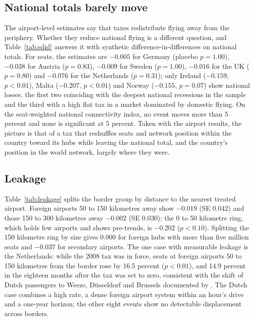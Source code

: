 \subsection{National totals barely move}

The airport-level estimates say that taxes redistribute flying away from the periphery. Whether they
reduce national flying is a different question, and Table~\ref{tab:sdid} answers it with synthetic
difference-in-differences on national totals. For seats, the estimates are $-0.005$ for Germany (placebo
$p=1.00$), $-0.038$ for Austria ($p=0.83$), $-0.009$ for Sweden ($p=1.00$), $-0.016$ for the UK
($p=0.80$) and $-0.076$ for the Netherlands ($p=0.31$); only Ireland ($-0.159$, $p<0.01$), Malta
($-0.207$, $p<0.01$) and Norway ($-0.155$, $p=0.07$) show national losses, the first two coinciding with
the deepest national recessions in the sample and the third with a high flat tax in a market dominated
by domestic flying. On the seat-weighted national connectivity index, no event moves more than 5
percent and none is significant at 5 percent. Taken with the airport results, the picture is that of a
tax that reshuffles seats and network position within the country toward its hubs while leaving the
national total, and the country's position in the world network, largely where they were.

\subsection{Leakage}

Table~\ref{tab:leakage} splits the border group by distance to the nearest treated airport. Foreign
airports 50 to 150 kilometres away show $-0.019$ (SE 0.042) and those 150 to 300 kilometres away
$-0.002$ (SE 0.030); the 0 to 50 kilometre ring, which holds few airports and shows pre-trends, is
$-0.202$ ($p<0.10$). Splitting the 150 kilometre ring by size gives $0.000$ for foreign hubs with more
than five million seats and $-0.037$ for secondary airports. The one case with measurable leakage is
the Netherlands: while the 2008 tax was in force, seats at foreign airports 50 to 150 kilometres from
the border rose by 16.5 percent ($p<0.01$), and 14.9 percent in the eighteen months after the tax was
set to zero, consistent with the shift of Dutch passengers to Weeze, D\"usseldorf and Brussels
documented by \citet{gordijn2011}. The Dutch case combines a high rate, a dense foreign airport system
within an hour's drive and a one-year horizon; the other eight events show no detectable displacement
across borders.

